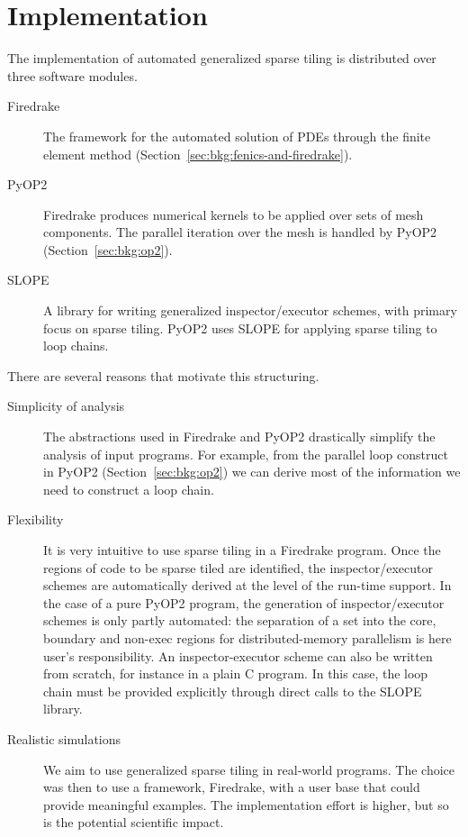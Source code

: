 
\section{Implementation}
\label{sec:tiling:automation}
The implementation of automated generalized sparse tiling is distributed over three software modules. 
\begin{description}
\item[Firedrake] The framework for the automated solution of PDEs through the finite element method (Section~\ref{sec:bkg:fenics-and-firedrake}).
\item[PyOP2] Firedrake produces numerical kernels to be applied over sets of mesh components. The parallel iteration over the mesh is handled by PyOP2 (Section~\ref{sec:bkg:op2}).
\item[SLOPE] A library for writing generalized inspector/executor schemes, with primary focus on sparse tiling. PyOP2 uses SLOPE for applying sparse tiling to loop chains.
\end{description}

There are several reasons that motivate this structuring.
\begin{description}
\item[Simplicity of analysis] The abstractions used in Firedrake and PyOP2 drastically simplify the analysis of input programs. For example, from the parallel loop construct in PyOP2 (Section~\ref{sec:bkg:op2}) we can derive most of the information we need to construct a loop chain.
\item[Flexibility] It is very intuitive to use sparse tiling in a Firedrake program. Once the regions of code to be sparse tiled are identified, the inspector/executor schemes are automatically derived at the level of the run-time support. In the case of a pure PyOP2 program, the generation of inspector/executor schemes is only partly automated: the separation of a set into the core, boundary and non-exec regions for distributed-memory parallelism is here user's responsibility. An inspector-executor scheme can also be written from scratch, for instance in a plain C program. In this case, the loop chain must be provided explicitly through direct calls to the SLOPE library. 
\item[Realistic simulations] We aim to use generalized sparse tiling in real-world programs. The choice was then to use a framework, Firedrake, with a user base that could provide meaningful examples. The implementation effort is higher, but so is the potential scientific impact.
\end{description}


